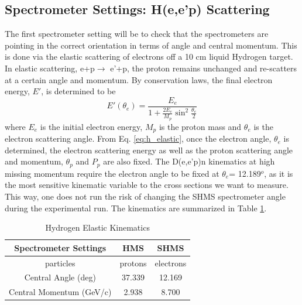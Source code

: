 \documentclass[letterpaper, 12 pt, conference]{ieeeconf}  %
\begin{document}
\subsection{Spectrometer Settings: H(e,e'p) Scattering}
\noindent The first spectrometer setting will be to check that the spectrometers are pointing in the correct orientation in terms of angle and central
momentum. This is done via the elastic scattering of electrons off a 10 cm liquid Hydrogen target. In elastic scattering, e+p$\rightarrow$ e'+p, the
proton remains unchanged and re-scatters at a certain angle and momentum. By conservation laws, the final electron energy, $E'$, is determined to be
\begin{equation}\label{eq:h_elastic}
E'(\theta_{e}) = \frac{E_{e}}{1 + \frac{2E_{e}}{M_{p}}\sin^{2}\frac{\theta_{e}}{2}}
\end{equation}
where $E_{e}$ is the initial electron energy, $M_{p}$ is the proton mass and $\theta_{e}$ is the electron scattering angle. From Eq. \ref{eq:h_elastic},
once the electron angle, $\theta_{e}$ is determined, the electron scattering energy as well as the proton scattering angle and momentum, $\theta_{p}$ and $P_{p}$
are also fixed. The D(e,e'p)n kinematics at high missing momentum require the electron angle to be fixed at $\theta_{e}$= 12.189$^{o}$, as it is the most
sensitive kinematic variable to the cross sections we want to measure. This way, one does not run the risk of changing the SHMS spectrometer angle during the
experimental run. The kinematics are summarized in Table \ref{Table:h_elastic_kin}.
\begin{table}[ht]
\caption{Hydrogen Elastic Kinematics}
\centering
{\def\arraystretch{1.6}\tabcolsep=5pt
\begin{tabular}{c c c}
\hline\hline
\textbf{Spectrometer Settings} & \textbf{HMS} & \textbf{SHMS} \\ [0.5ex] %
\hline
particles                  & protons & electrons \\
Central Angle (deg)        & 37.339 & 12.169  \\
Central Momentum (GeV/c)   & 2.938 & 8.700  \\ [1ex]
\hline
\end{tabular}
}
\label{Table:h_elastic_kin}
\end{table} \\
\end{document}
